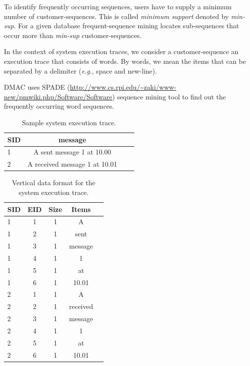 To identify frequently occurring sequences, users have to 
supply a minimum number of customer-sequences. This is called 
\textit{minimum support} denoted by \textit{min-sup}. 
For a given database frequent-sequence mining locates sub-sequences 
that occur more than \textit{min-sup} customer-sequences.

In the context of system execution traces, we consider a 
customer-sequence an execution trace that consists of words. 
By words, we mean the items that can be separated by a delimiter 
(\textit{e.g.}, space and new-line). 

DMAC uses SPADE (\url{http://www.cs.rpi.edu/~zaki/www-new/pmwiki.php/Software/Software}) 
sequence mining tool to find out the frequently occurring word sequences. 

\begin{table}[h]
 \centering
 \caption{Sample system execution trace.}
 \label{table:trace1}
 \begin{tabular}{lccl}
 \hline
 \textbf{SID} & \textbf{message} \\
 \hline
 1 & A sent message 1 at 10.00 \\
 2 & A received message 1 at 10.01 \\
 \end{tabular}
\end{table}

\begin{table}[h]
 \centering
 \caption{Vertical data format for the system execution trace.}
 \label{table:trace-v-format}
 \begin{tabular}{lcccl}
 \hline
 \textbf{SID} & \textbf{EID} & \textbf{Size} & \textbf{Items} \\
 \hline
 1 & 1 & 1 & A \\ 
 1 & 2 & 1 & sent \\
 1 & 3 & 1 & message \\
 1 & 4 & 1 & 1 \\
 1 & 5 & 1 & at \\
 1 & 6 & 1 & 10.01 \\
 2 & 1 & 1 & A \\ 
 2 & 2 & 1 & received \\
 2 & 3 & 1 & message \\
 2 & 4 & 1 & 1 \\
 2 & 5 & 1 & at \\
 2 & 6 & 1 & 10.01 \\
 \end{tabular}
\end{table}

